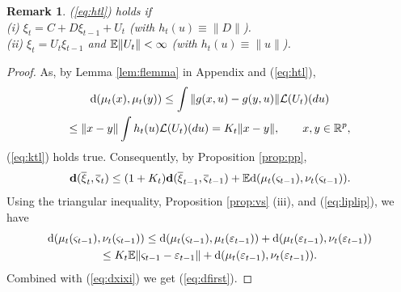 \documentclass{article}              %
\newtheorem{remark}{Remark}
\begin{document}
\begin{remark}
(\ref{eq:htl}) holds if\\
(i) $\xi_{t}=C+D\xi_{t-1}+U_{t}$ (with $h_{t}(u)\equiv\|D\|$). \\
(ii) $\xi_{t}=U_{t}\xi{}_{t-1}$ and $\mathbb{E} \| U_t \| < \infty$ (with $h_{t}(u)\equiv\|u\|$).
\end{remark}



\begin{proof}
As, by Lemma \ref{lem:flemma} in Appendix and (\ref{eq:htl}),
\begin{multline}
\mathrm{d}(\mu_{t}(x),\mu_{t}(y))\leq\int\|g(x,u)-g(y,u)\|\mathcal{L}(U_{t})(du)
\\
\leq\|x-y\|\int h_{t}(u)\mathcal{L}(U_{t})(du)
=K_t \|x-y\| 
,\qquad x,y\in\mathbb{R}^{p},
\label{eq:liplip}
\end{multline}
(\ref{eq:ktl}) holds true. Consequently, by Proposition \ref{prop:pp},
\begin{equation}
\mathbf{d}(\overline{\xi}_{t},\overline{\varsigma}_{t})\leq(1+K_{t})\mathbf{d}(\overline{\xi}_{t-1},\overline{\varsigma}_{t-1})+\mathbb{E}\mathrm{d}(\mu_{t}(\varsigma_{t-1}),\nu_{t}(\varsigma_{t-1})).
\label{eq:dxixi}
\end{equation}
Using the triangular inequality, Proposition \ref{prop:vs} (iii), and (\ref{eq:liplip}), we have
\begin{multline*}
\mathrm{d}(\mu_{t}(\varsigma_{t-1}),\nu_{t}(\varsigma_{t-1}))\leq\mathrm{d}(\mu_{t}(\varsigma_{t-1}),\mu_{t}(\varepsilon_{t-1}))+\mathrm{d}(\mu_{t}(\varepsilon_{t-1}),\nu_{t}(\varepsilon{}_{t-1}))
\\
\leq
K_t \mathbb{E} \|\varsigma_{t-1}-\varepsilon_{t-1}\|+\mathrm{d}(\mu_{t}(\varepsilon_{t-1}),\nu_{t}(\varepsilon{}_{t-1})).
\end{multline*}
Combined with (\ref{eq:dxixi}) we get (\ref{eq:dfirst}). 


\end{proof}
\end{document}
